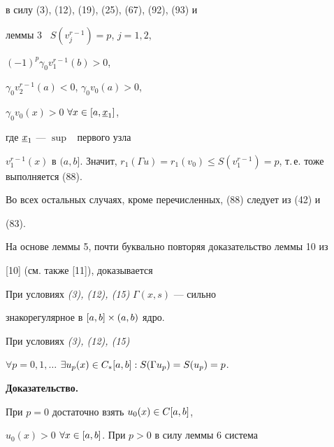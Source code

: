 \begin{pf}
в силу (3), (12), (19), (25), (67), (92), (93) и


леммы 3 \ $S(v^{r-1}_j)=p$, $j=1,2$,


$(-1)^p\gamma_0v^{r-1}_1(b)>0$,


$\gamma_0v^{r-1}_2(a)<0$, $\gamma_0v_0(a)>0$,


$\gamma_0v_0(x)>0$ \; $\forall x\in[a,\underline{x}_1]$,


где $\underline{x}_1$ --- $\sup$ \ первого узла


$v^{r-1}_1(x)$ в $(a,b]$. Значит, $r_1(\Gamma u)=r_1(v_0)\le


S(v^{r-1}_1)=p$, т.\,е. тоже выполняется (88).





Во всех остальных случаях, кроме перечисленных, (88) следует из (42) и


(83).


\end{pf}





На основе леммы 5, почти буквально повторяя доказательство леммы 10 из


[10] (см. также [11]), доказывается








\begin{lem}


При условиях {\em (3), (12), (15)} $\Gamma(x,s)$ --- сильно


знакорегулярное в $[a,b]\times(a,b)$ ядро.


\end{lem}








\begin{lem}


При условиях {\em (3), (12), (15)}


$\forall p=0,1,\dotsc$ \; $\exists u_p(x)\in C_*[a,b]: S(\Gamma u_p)=S(u_p)=p$.


\end{lem}








{\bf Доказательство.}


При $p=0$ достаточно взять $u_0(x)\in C[a,b]$,


$u_0(x)>0$ \; $\forall x\in [a,b]$. При $p>0$ в силу леммы 6 система


